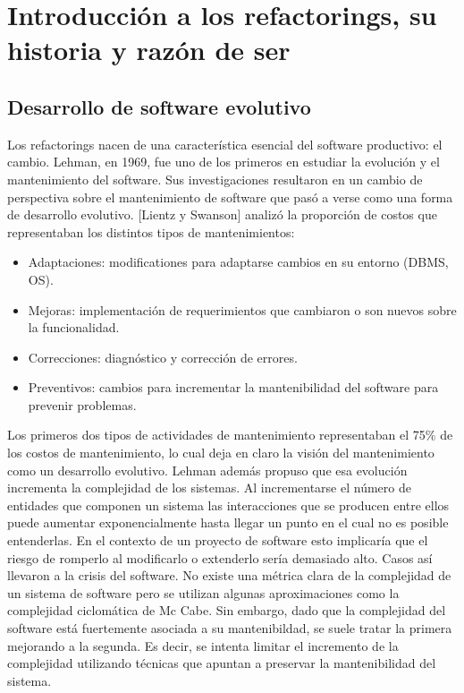 \section{Introducción a los refactorings, su historia y razón de ser}

\subsection{Desarrollo de software evolutivo}
Los refactorings nacen de una característica esencial del software productivo: el cambio.
Lehman, en 1969, fue uno de los primeros en estudiar la evolución y el mantenimiento del software. Sus 
investigaciones resultaron en un cambio de perspectiva sobre el mantenimiento de software que pasó 
a verse como una forma de desarrollo evolutivo. 
[Lientz y Swanson] analizó la proporción de costos que representaban los distintos tipos de mantenimientos:

\begin{itemize}
    \item Adaptaciones: modificationes para adaptarse cambios en su entorno (DBMS, OS).
    \item Mejoras: implementación de requerimientos que cambiaron o son nuevos sobre la funcionalidad.
    \item Correcciones: diagnóstico y corrección de errores.
    \item Preventivos: cambios para incrementar la mantenibilidad del software para prevenir problemas.
\end{itemize}

Los primeros dos tipos de actividades de mantenimiento representaban el 75\% de los costos de mantenimiento,
lo cual deja en claro la visión del mantenimiento como un desarrollo evolutivo. Lehman además propuso
que esa evolución incrementa la complejidad de los sistemas. Al incrementarse el número de entidades
que componen un sistema las interacciones que se producen entre ellos puede aumentar exponencialmente
hasta llegar un punto en el cual no es posible entenderlas. En el contexto de un proyecto de software
esto implicaría que el riesgo de romperlo al modificarlo o extenderlo sería demasiado alto. Casos así
llevaron a la crisis del software.
No existe una métrica clara de la complejidad de un sistema de software pero se utilizan algunas aproximaciones
como la complejidad ciclomática de Mc Cabe. Sin embargo, dado que la complejidad del software está fuertemente
asociada a su mantenibildad, se suele tratar la primera mejorando a la segunda. Es decir, se intenta
limitar el incremento de la complejidad utilizando técnicas que apuntan a preservar la mantenibilidad
del sistema.


